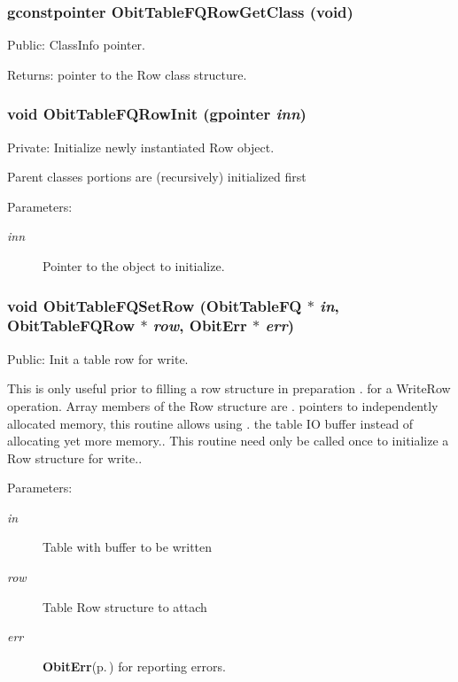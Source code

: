 \subsubsection{\setlength{\rightskip}{0pt plus 5cm}gconstpointer Obit\-Table\-FQRow\-Get\-Class (void)}\label{ObitTableFQ_8c_a15}


Public: Class\-Info pointer. 

\begin{Desc}
\item[Returns:]pointer to the Row class structure. \end{Desc}
\subsubsection{\setlength{\rightskip}{0pt plus 5cm}void Obit\-Table\-FQRow\-Init (gpointer {\em inn})}\label{ObitTableFQ_8c_a6}


Private: Initialize newly instantiated Row object. 

Parent classes portions are (recursively) initialized first \begin{Desc}
\item[Parameters:]
\begin{description}
\item[{\em inn}]Pointer to the object to initialize. \end{description}
\end{Desc}
\subsubsection{\setlength{\rightskip}{0pt plus 5cm}void Obit\-Table\-FQSet\-Row ({\bf Obit\-Table\-FQ} $\ast$ {\em in}, {\bf Obit\-Table\-FQRow} $\ast$ {\em row}, {\bf Obit\-Err} $\ast$ {\em err})}\label{ObitTableFQ_8c_a23}


Public: Init a table row for write. 

This is only useful prior to filling a row structure in preparation . for a Write\-Row operation. Array members of the Row structure are . pointers to independently allocated memory, this routine allows using . the table IO buffer instead of allocating yet more memory.. This routine need only be called once to initialize a Row structure for write.. \begin{Desc}
\item[Parameters:]
\begin{description}
\item[{\em in}]Table with buffer to be written \item[{\em row}]Table Row structure to attach \item[{\em err}]{\bf Obit\-Err}{\rm (p.\,\pageref{structObitErr})} for reporting errors. \end{description}
\end{Desc}

